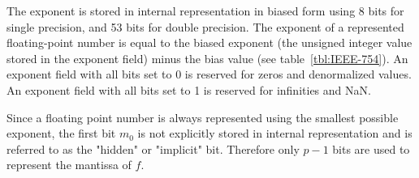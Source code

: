   \begin{comment}
  Let $\F$ be the set of all floating-point numbers $f = sm2^e$ represented in some binary IEEE 754-2008 format \cite{ieee754} where $s \in \{1, -1\}$ is the \textbf{sign},
  $e \in \Z$, $e_{\max} \geq e \geq e_{\min}$ is the \textbf{exponent} ($\exp(f)$ is
  defined to be $e$), $p \in \Z, p > 1$ is the \textbf{precision},
  and $m=m_0.m_1m_2...m_{p-1}$ where $m_0, ..., m_{p - 1} \in \{0, 1\}$ is the
  \textbf{significand} of $f$. Assume that the representation of $f$ is made unique using the ``hidden bit'' convention, so that $f$ is represented using the smallest exponent possible. (In memory, the bit $m_0$ is not stored and assumed to be 1 unless the exponent field contains a special value signaling both that $e = e_{\min}$ and $m_0=0$).
  $f$ is said to be \textbf{normalized} if $m_0 =1$
  and $e \geq e_{\min}$, \textbf{unnormalized} if $m_0 = 0$, and
  \textbf{denormalized} if $m_0 = 0$ and $e = e_{\min}$. $f = 0$ if all $m_j = 0$
  and $e = e_{\min}$.

  Assume that floating point arithmetic complies with the IEEE 754-2008
  standard \cite{ieee754} in some ``to nearest'' rounding mode (no specific tie
  breaking behaviour is required) and that underflow occurs gradually, although
  methods to handle abrupt underflow will be considered in Section
  \ref{sec:indexed_underflow_abrupt}.

  Let $f = sm2^e \in \F$ be a floating-point number represented in IEEE
  754-2008 format \cite{ieee754} where $s \in \{1, -1\}$ is the \textbf{sign},
  $e_{\max} \geq e \geq e_{\min}$ is the \textbf{exponent} ($\exp(f)$ is
  defined to be $e$), $p$ is the \textbf{precision},
  and $m=m_0.m_1m_2...m_{p-1}$ where $m_0, ..., m_{p - 1} \in \{0, 1\}$ is the
  \textbf{significand} of $f$.
  \end{comment}

  The exponent is stored in internal representation in biased form
  using 8 bits for single precision, and 53 bits for double precision.
  The exponent of a represented floating-point number is equal to
  the biased exponent (the unsigned integer value stored in the exponent field)
  minus the bias value (see table~\ref{tbl:IEEE-754}).
  An exponent field with all bits set to 0 is reserved for zeros and denormalized values.
  An exponent field with all bits set to 1 is reserved for infinities and NaN.

  Since a floating point number is always represented using the smallest possible
  exponent, the first bit $m_0$ is not explicitly stored in internal representation
  and is referred to as the "hidden" or "implicit" bit.
  Therefore only $p-1$ bits are used to represent the mantissa of $f$.


